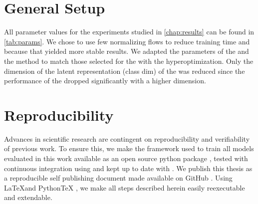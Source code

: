 \section{General Setup}
All parameter values for the experiments studied in \cref{chap:results} can be found in \cref{tab:params}.
We chose to use few normalizing flows to reduce training time and because that yielded more stable results.
We adapted the parameters of the  and the  method to match those selected for the  with the hyperoptimization.
Only the dimension of the latent representation (class dim) of the  was reduced since the performance of the  dropped significantly with a higher dimension.





\section{Reproducibility}
Advances in scientific research are contingent on reproducibility and verifiability of previous work.
To ensure this, we make the framework used to train all models evaluated in this work available as an open source python package \citep{mmvae_github}, tested with continuous integration using \citep{travis} and kept up to date with \citep{dependabot}.
We publish this thesis as a reproducible self publishing document \citep[\href{https://github.com/TheChymera/RepSeP}{RepSeP}]{repsep} made available on GitHub \citep{mmnf_repsep}.
Using \LaTeX and PythonTeX \citep{pytex}, we make all steps described herein easily reexecutable and extendable.